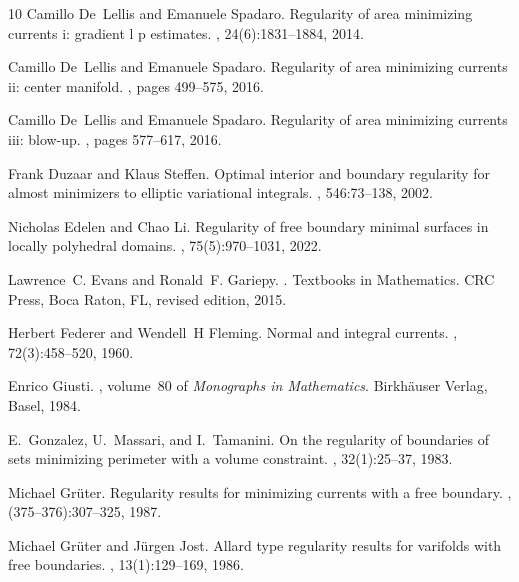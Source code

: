 \documentclass[a4paper,reqno,11pt]{amsart}
\begin{document}
\begin{thebibliography}{10}
Camillo De~Lellis and Emanuele Spadaro.
\newblock Regularity of area minimizing currents i: gradient l p estimates.
, 24(6):1831--1884, 2014.

Camillo De~Lellis and Emanuele Spadaro.
\newblock Regularity of area minimizing currents ii: center manifold.
, pages 499--575, 2016.

Camillo De~Lellis and Emanuele Spadaro.
\newblock Regularity of area minimizing currents iii: blow-up.
, pages 577--617, 2016.

Frank Duzaar and Klaus Steffen.
\newblock Optimal interior and boundary regularity for almost minimizers to
  elliptic variational integrals.
, 546:73--138, 2002.

Nicholas Edelen and Chao Li.
\newblock Regularity of free boundary minimal surfaces in locally polyhedral
  domains.
, 75(5):970--1031, 2022.

Lawrence~C. Evans and Ronald~F. Gariepy.
.
\newblock Textbooks in Mathematics. CRC Press, Boca Raton, FL, revised edition,
  2015.

Herbert Federer and Wendell~H Fleming.
\newblock Normal and integral currents.
, 72(3):458--520, 1960.

Enrico Giusti.
, volume~80
  of {\em Monographs in Mathematics}.
\newblock Birkh\"{a}user Verlag, Basel, 1984.

E.~Gonzalez, U.~Massari, and I.~Tamanini.
\newblock On the regularity of boundaries of sets minimizing perimeter with a
  volume constraint.
, 32(1):25--37, 1983.

Michael Gr{\"u}ter.
\newblock Regularity results for minimizing currents with a free boundary.
, (375--376):307--325, 1987.

Michael Gr\"{u}ter and J\"{u}rgen Jost.
\newblock Allard type regularity results for varifolds with free boundaries.
, 13(1):129--169, 1986.


\end{thebibliography}
\end{document}

